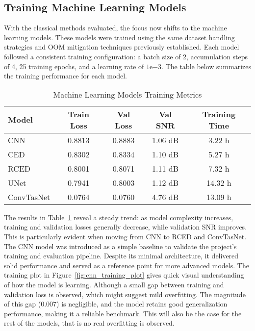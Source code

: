 \subsection{Training Machine Learning Models}
\label{sec:training_ml_models}

With the classical methods evaluated, the focus now shifts to the machine learning models. These models were trained using the same dataset handling strategies and OOM mitigation techniques previously established. Each model followed a consistent training configuration: a batch size of 2, accumulation steps of 4, 25 training epochs, and a learning rate of $1\text{e}{-3}$. The table below summarizes the training performance for each model.

\vspace{1em}
\begin{table}[H]
\centering
\caption{Machine Learning Models Training Metrics}
\label{tab:ml_training}
\begin{tabular}{|l|c|c|c|c|}
\hline
\textbf{Model} & \textbf{Train Loss} & \textbf{Val Loss} & \textbf{Val SNR} & \textbf{Training Time} \\
\hline
CNN         & 0.8813 & 0.8883 & 1.06 dB & 3.22 h \\
CED         & 0.8302 & 0.8334 & 1.10 dB & 5.27 h \\
RCED        & 0.8001 & 0.8071 & 1.11 dB & 7.32 h \\
UNet        & 0.7941 & 0.8003 & 1.12 dB & 14.32 h \\
ConvTasNet  & 0.0764 & 0.0760 & 4.76 dB & 13.09 h \\
\hline
\end{tabular}
\end{table}

The results in Table~\ref{tab:ml_training} reveal a steady trend: as model complexity increases, training and validation losses generally decrease, while validation SNR improves. This is particularly evident when moving from CNN to RCED and ConvTasNet. The CNN model was introduced as a simple baseline to validate the project’s training and evaluation pipeline. Despite its minimal architecture, it delivered solid performance and served as a reference point for more advanced models. The training plot in Figure~\ref{fig:cnn_training_plot} gives quick visual understanding of how the model is learning. Although a small gap between training and validation loss is observed, which might suggest mild overfitting. The magnitude of this gap (0.007) is negligible, and the model retains good generalization performance, making it a reliable benchmark. This will also be the case for the rest of the models, that is no real overfitting is observed.

